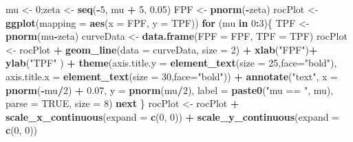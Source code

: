 \documentclass[
]{book}
\newenvironment{Shaded}{\begin{snugshade}}{\end{snugshade}}
\newcommand{\ControlFlowTok}[1]{\textcolor[rgb]{0.13,0.29,0.53}{\textbf{#1}}}
\newcommand{\DataTypeTok}[1]{\textcolor[rgb]{0.13,0.29,0.53}{#1}}
\newcommand{\DecValTok}[1]{\textcolor[rgb]{0.00,0.00,0.81}{#1}}
\newcommand{\FloatTok}[1]{\textcolor[rgb]{0.00,0.00,0.81}{#1}}
\newcommand{\KeywordTok}[1]{\textcolor[rgb]{0.13,0.29,0.53}{\textbf{#1}}}
\newcommand{\NormalTok}[1]{#1}
\newcommand{\OperatorTok}[1]{\textcolor[rgb]{0.81,0.36,0.00}{\textbf{#1}}}
\newcommand{\OtherTok}[1]{\textcolor[rgb]{0.56,0.35,0.01}{#1}}
\newcommand{\StringTok}[1]{\textcolor[rgb]{0.31,0.60,0.02}{#1}}
\begin{document}
\begin{Shaded}
\begin{Highlighting}[]
\NormalTok{mu \textless{}{-}}\StringTok{ }\DecValTok{0}\NormalTok{;zeta \textless{}{-}}\StringTok{ }\KeywordTok{seq}\NormalTok{(}\OperatorTok{{-}}\DecValTok{5}\NormalTok{, mu }\OperatorTok{+}\StringTok{ }\DecValTok{5}\NormalTok{, }\FloatTok{0.05}\NormalTok{)}
\NormalTok{FPF \textless{}{-}}\StringTok{ }\KeywordTok{pnorm}\NormalTok{(}\OperatorTok{{-}}\NormalTok{zeta)}
\NormalTok{rocPlot \textless{}{-}}\StringTok{ }\KeywordTok{ggplot}\NormalTok{(}\DataTypeTok{mapping =} \KeywordTok{aes}\NormalTok{(}\DataTypeTok{x =}\NormalTok{ FPF, }\DataTypeTok{y =}\NormalTok{ TPF))}
\ControlFlowTok{for}\NormalTok{ (mu }\ControlFlowTok{in} \DecValTok{0}\OperatorTok{:}\DecValTok{3}\NormalTok{)\{}
\NormalTok{  TPF \textless{}{-}}\StringTok{ }\KeywordTok{pnorm}\NormalTok{(mu}\OperatorTok{{-}}\NormalTok{zeta)}
\NormalTok{  curveData \textless{}{-}}\StringTok{ }\KeywordTok{data.frame}\NormalTok{(}\DataTypeTok{FPF =}\NormalTok{ FPF, }\DataTypeTok{TPF =}\NormalTok{ TPF)}
\NormalTok{  rocPlot \textless{}{-}}\StringTok{ }\NormalTok{rocPlot }\OperatorTok{+}\StringTok{ }\KeywordTok{geom\_line}\NormalTok{(}\DataTypeTok{data =}\NormalTok{ curveData, }\DataTypeTok{size =} \DecValTok{2}\NormalTok{) }\OperatorTok{+}\StringTok{ }
\StringTok{    }\KeywordTok{xlab}\NormalTok{(}\StringTok{"FPF"}\NormalTok{)}\OperatorTok{+}\StringTok{ }\KeywordTok{ylab}\NormalTok{(}\StringTok{"TPF"}\NormalTok{ ) }\OperatorTok{+}\StringTok{ }
\StringTok{    }\KeywordTok{theme}\NormalTok{(}\DataTypeTok{axis.title.y =} \KeywordTok{element\_text}\NormalTok{(}\DataTypeTok{size =} \DecValTok{25}\NormalTok{,}\DataTypeTok{face=}\StringTok{"bold"}\NormalTok{),}
          \DataTypeTok{axis.title.x =} \KeywordTok{element\_text}\NormalTok{(}\DataTypeTok{size =} \DecValTok{30}\NormalTok{,}\DataTypeTok{face=}\StringTok{"bold"}\NormalTok{))  }\OperatorTok{+}
\StringTok{  }\KeywordTok{annotate}\NormalTok{(}\StringTok{"text"}\NormalTok{, }\DataTypeTok{x =} \KeywordTok{pnorm}\NormalTok{(}\OperatorTok{{-}}\NormalTok{mu}\OperatorTok{/}\DecValTok{2}\NormalTok{) }\OperatorTok{+}\StringTok{ }\FloatTok{0.07}\NormalTok{, }\DataTypeTok{y =} \KeywordTok{pnorm}\NormalTok{(mu}\OperatorTok{/}\DecValTok{2}\NormalTok{), }
             \DataTypeTok{label =} \KeywordTok{paste0}\NormalTok{(}\StringTok{"mu == "}\NormalTok{, mu), }\DataTypeTok{parse =} \OtherTok{TRUE}\NormalTok{, }\DataTypeTok{size =} \DecValTok{8}\NormalTok{)}
  \ControlFlowTok{next}
\NormalTok{\}}
\NormalTok{rocPlot \textless{}{-}}\StringTok{ }\NormalTok{rocPlot }\OperatorTok{+}
\StringTok{  }\KeywordTok{scale\_x\_continuous}\NormalTok{(}\DataTypeTok{expand =} \KeywordTok{c}\NormalTok{(}\DecValTok{0}\NormalTok{, }\DecValTok{0}\NormalTok{)) }\OperatorTok{+}\StringTok{ }
\StringTok{  }\KeywordTok{scale\_y\_continuous}\NormalTok{(}\DataTypeTok{expand =} \KeywordTok{c}\NormalTok{(}\DecValTok{0}\NormalTok{, }\DecValTok{0}\NormalTok{))     }
  

\end{Highlighting}
\end{Shaded}
\end{document}
